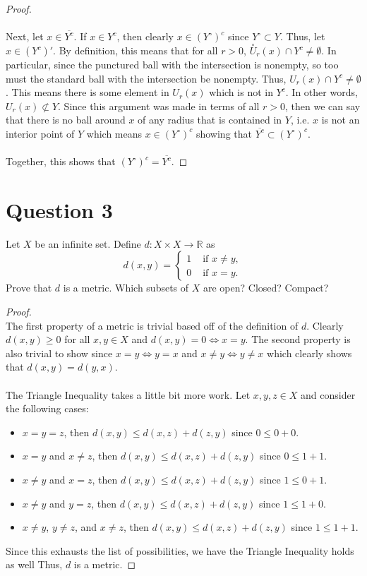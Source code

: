 \documentclass[10pt,a4paper]{article}
\theoremstyle{definition}
\theoremstyle{definition}
\begin{document}
\begin{enumerate}[label = (\alph*)]
\begin{proof}
	\\
	\\Next, let $x \in \overline{Y^c}$. If $x \in Y^c$, then clearly $x \in (Y^\circ)^c$ since $Y^\circ \subset Y$. Thus, let $x \in (Y^c)'$. By definition, this means that for all $r > 0$, $\stackrel{\circ}{U}_r(x) \cap Y^c \neq \emptyset$. In particular, since the punctured ball with the intersection is nonempty, so too must the standard ball with the intersection be nonempty. Thus, $U_r(x) \cap Y^c \neq \emptyset$. This means there is some element in $U_r(x)$ which is not in $Y^c$. In other words, $U_r(x) \not \subset Y$. Since this argument was made in terms of all $r > 0$, then we can say that there is no ball around $x$ of any radius that is contained in $Y$, i.e. $x$ is not an interior point of $Y$ which means $x \in (Y^\circ)^c$ showing that $\overline{Y^c} \subset (Y^\circ)^c$. 
	\\
	\\Together, this shows that $(Y^\circ)^c = \overline{Y^c}$. 
	\end{proof}
\end{enumerate}

\section*{Question 3}
Let $X$ be an infinite set. Define $d: X \times X \to \mathbb{R}$ as $$
d(x, y) = \begin{cases}
1 &\text{ if } x \neq y, \\
0 &\text{ if } x = y.
\end{cases}$$
Prove that $d$ is a metric. Which subsets of $X$ are open? Closed? Compact?

\begin{proof}$ $
\\The first property of a metric is trivial based off of the definition of $d$. Clearly $d(x, y) \geq 0$ for all $x, y \in X$ and $d(x, y) = 0 \iff x = y$. The second property is also trivial to show since $x = y \iff y = x$ and $x \neq y \iff y \neq x$ which clearly shows that $d(x, y) = d(y, x)$. 
\\
\\The Triangle Inequality takes a little bit more work. Let $x, y, z \in X$ and consider the following cases:
\begin{itemize}
\item $x = y = z$, then $d(x, y) \leq d(x, z) + d(z, y)$ since $0 \leq 0 + 0$. 
\item $x = y$ and $x \neq z$, then $d(x, y) \leq d(x, z) + d(z, y)$ since $0 \leq 1 + 1$. 
\item $x \neq y$ and $x = z$, then $d(x, y) \leq d(x, z) + d(z, y)$ since $1 \leq 0 + 1$. 
\item $x \neq y$ and $y = z$, then $d(x, y) \leq d(x, z) + d(z, y)$ since $1 \leq 1 + 0$. 
\item $x \neq y$, $y \neq z$, and $x \neq z$, then $d(x, y) \leq d(x, z) + d(z, y)$ since $1 \leq 1 + 1$. 
\end{itemize}
Since this exhausts the list of possibilities, we have the Triangle Inequality holds as well Thus, $d$ is a metric. 
\end{proof}
\end{document}
